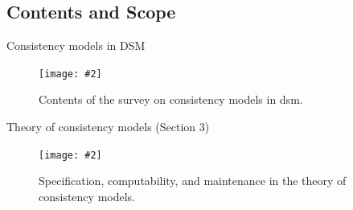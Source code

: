 \documentclass{beamer}
\newcommand{\fignocaption}[2]
{
  \begin{figure}[htp]
    \centering
      \texttt{[image: \#2]}
  \end{figure}
}
\newcommand{\fig}[3]
{
  \begin{figure}[htp]
    \centering
      \texttt{[image: \#2]}
      \caption[labelInTOC]{#3}
  \end{figure}
}
\newcommand{\largeblue}[1]{\textcolor{blue}{\large #1}}
\begin{document}
\subsection{Contents and Scope}

\begin{frame}{Consistency models in DSM}
  \fig{width = 0.90\textwidth}{fig/survey-contents.pdf}{Contents of the survey
  on consistency models in dsm.}
\end{frame}
\begin{frame}{Theory of consistency models (Section 3)}

  \fig{width = 0.75\textwidth}{fig/theory-of-consistency-models.pdf}
  {Specification, computability, and maintenance in the theory of consistency
  models.}

\end{frame}
\end{document}
